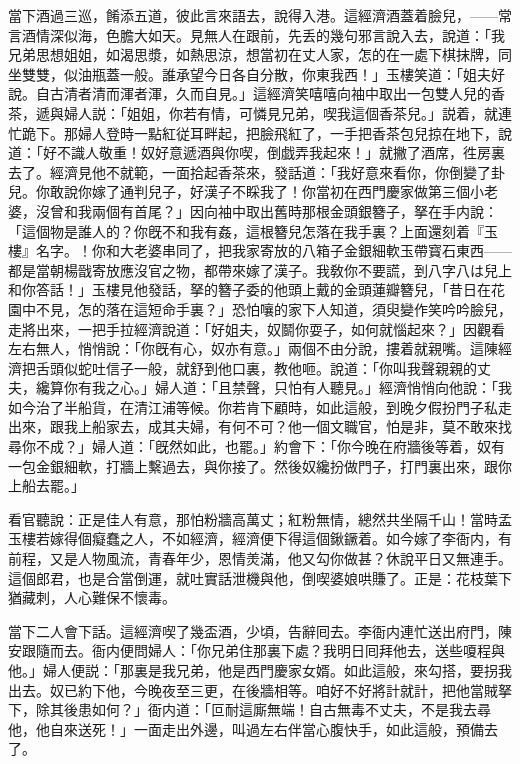 當下酒過三巡，餚添五道，彼此言來語去，說得入港。這經濟酒蓋着臉兒，——常言酒情深似海，色膽大如天。見無人在跟前，先丢的幾句邪言說入去，說道：「我兄弟思想姐姐，如渴思漿，如熱思涼，想當初在丈人家，怎的在一處下棋抹牌，同坐雙雙，似油瓶蓋一般。誰承望今日各自分散，你東我西！」玉樓笑道：「姐夫好說。自古清者清而渾者渾，久而自見。」這經濟笑嘻嘻向袖中取出一包雙人兒的香茶，遞與婦人説：「姐姐，你若有情，可憐見兄弟，喫我這個香茶兒。」説着，就連忙跪下。那婦人登時一點紅従耳畔起，把臉飛紅了，一手把香茶包兒掠在地下，說道：「好不識人敬重！奴好意遞酒與你喫，倒戯弄我起來！」就撇了酒席，徃房裏去了。經濟見他不就範，一面拾起香茶來，發話道：「我好意來看你，你倒變了卦兒。你敢說你嫁了通判兒子，好漢子不睬我了！你當初在西門慶家做第三個小老婆，沒曾和我兩個有首尾？」因向袖中取出舊時那根金頭銀簪子，拏在手内說：「這個物是誰人的？你旣不和我有姦，這根簪兒怎落在我手裏？上面還刻着『玉樓』名字。！你和大老婆串同了，把我家寄放的八箱子金銀細軟玉帶寳石東西——都是當朝楊戩寄放應沒官之物，都帶來嫁了漢子。我敎你不要謊，到八字八は兒上和你答話！」玉樓見他發話，拏的簪子委的他頭上戴的金頭蓮瓣簪兒，「昔日在花園中不見，怎的落在這短命手裏？」恐怕嚷的家下人知道，須臾變作笑吟吟臉兒，走將出來，一把手拉經濟說道：「好姐夫，奴鬬你耍子，如何就惱起來？」因觀看左右無人，悄悄說：「你旣有心，奴亦有意。」兩個不由分說，摟着就親嘴。這陳經濟把舌頭似蛇吐信子一般，就舒到他口裏，教他咂。說道：「你叫我聲親親的丈夫，纔算你有我之心。」婦人道：「且禁聲，只怕有人聽見。」經濟悄悄向他說：「我如今治了半船貨，在清江浦等候。你若肯下顧時，如此這般，到晚夕假扮門子私走出來，跟我上船家去，成其夫婦，有何不可？他一個文職官，怕是非，莫不敢來找尋你不成？」婦人道：「旣然如此，也罷。」約會下：「你今晚在府牆後等着，奴有一包金銀細軟，打牆上繫過去，與你接了。然後奴纔扮做門子，打門裏出來，跟你上船去罷。」

看官聽說：正是佳人有意，那怕粉牆高萬丈；紅粉無情，總然共坐隔千山！當時孟玉樓若嫁得個癡蠢之人，不如經濟，經濟便下得這個鍬鐝着。如今嫁了李衙内，有前程，又是人物風流，青春年少，恩情羙滿，他又勾你做甚？休說平日又無連手。這個郎君，也是合當倒運，就吐實話泄機與他，倒喫婆娘哄賺了。正是：花枝葉下猶藏刺，人心難保不懷毒。

當下二人會下話。這經濟喫了幾盃酒，少頃，告辭囘去。李衙内連忙送出府門，陳安跟隨而去。衙内便問婦人：「你兄弟住那裏下處？我明日囘拜他去，送些嗄程與他。」婦人便説：「那裏是我兄弟，他是西門慶家女婿。如此這般，來勾搭，要拐我出去。奴已約下他，今晚夜至三更，在後牆相等。咱好不好將計就計，把他當賊拏下，除其後患如何？」衙内道：「叵耐這廝無端！自古無毒不丈夫，不是我去尋他，他自來送死！」一面走出外邊，叫過左右伴當心腹快手，如此這般，預備去了。

